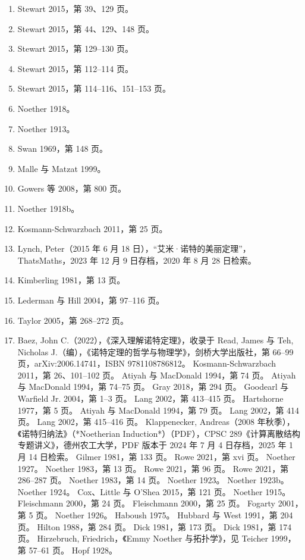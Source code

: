 \begin{enumerate}
\item Stewart 2015，第 39、129 页。
\item Stewart 2015，第 44、129、148 页。
\item Stewart 2015，第 129–130 页。
\item Stewart 2015，第 112–114 页。
\item Stewart 2015，第 114–116、151–153 页。
\item Noether 1918。
\item Noether 1913。
\item Swan 1969，第 148 页。
\item Malle 与 Matzat 1999。
\item Gowers 等 2008，第 800 页。
\item Noether 1918b。
\item Kosmann-Schwarzbach 2011，第 25 页。
\item Lynch, Peter（2015 年 6 月 18 日），“艾米·诺特的美丽定理”，ThatsMaths，2023 年 12 月 9 日存档，2020 年 8 月 28 日检索。
\item Kimberling 1981，第 13 页。
\item Lederman 与 Hill 2004，第 97–116 页。
\item Taylor 2005，第 268–272 页。
\item Baez, John C.（2022），《深入理解诺特定理》，收录于 Read, James 与 Teh, Nicholas J.（编），《诺特定理的哲学与物理学》，剑桥大学出版社，第 66–99 页，arXiv:2006.14741，ISBN 9781108786812。
Kosmann-Schwarzbach 2011，第 26、101–102 页。
Atiyah 与 MacDonald 1994，第 74 页。
Atiyah 与 MacDonald 1994，第 74–75 页。
Gray 2018，第 294 页。
Goodearl 与 Warfield Jr. 2004，第 1–3 页。
Lang 2002，第 413–415 页。
Hartshorne 1977，第 5 页。
Atiyah 与 MacDonald 1994，第 79 页。
Lang 2002，第 414 页。
Lang 2002，第 415–416 页。
Klappenecker, Andreas（2008 年秋季），《诺特归纳法》（*Noetherian Induction*）（PDF），CPSC 289《计算离散结构专题讲义》，德州农工大学，PDF 版本于 2024 年 7 月 4 日存档，2025 年 1 月 14 日检索。
Gilmer 1981，第 133 页。
Rowe 2021，第 xvi 页。
Noether 1927。
Noether 1983，第 13 页。
Rowe 2021，第 96 页。
Rowe 2021，第 286–287 页。
Noether 1983，第 14 页。
Noether 1923。
Noether 1923b。
Noether 1924。
Cox、Little 与 O'Shea 2015，第 121 页。
Noether 1915。
Fleischmann 2000，第 24 页。
Fleischmann 2000，第 25 页。
Fogarty 2001，第 5 页。
Noether 1926。
Haboush 1975。
Hubbard 与 West 1991，第 204 页。
Hilton 1988，第 284 页。
Dick 1981，第 173 页。
Dick 1981，第 174 页。
Hirzebruch, Friedrich，《Emmy Noether 与拓扑学》，见 Teicher 1999，第 57–61 页。
Hopf 1928。

\end{enumerate}
